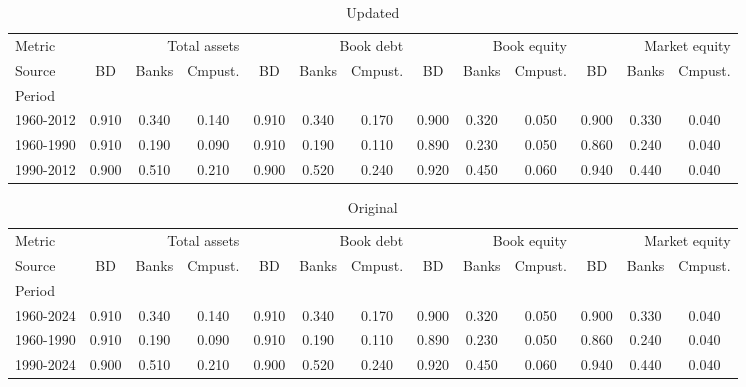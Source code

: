 \documentclass{article}
\begin{document}
    \begin{table}[htbp]
      \centering
      \caption{Updated}
      \label{tab:Table 2}
      \small
      \begin{tabular}{lcccccccccccc}
\toprule
Metric & \multicolumn{3}{r}{Total assets} & \multicolumn{3}{r}{Book debt} & \multicolumn{3}{r}{Book equity} & \multicolumn{3}{r}{Market equity} \\
Source & BD & Banks & Cmpust. & BD & Banks & Cmpust. & BD & Banks & Cmpust. & BD & Banks & Cmpust. \\
Period &  &  &  &  &  &  &  &  &  &  &  &  \\
\midrule
1960-2012 & 0.910 & 0.340 & 0.140 & 0.910 & 0.340 & 0.170 & 0.900 & 0.320 & 0.050 & 0.900 & 0.330 & 0.040 \\
1960-1990 & 0.910 & 0.190 & 0.090 & 0.910 & 0.190 & 0.110 & 0.890 & 0.230 & 0.050 & 0.860 & 0.240 & 0.040 \\
1990-2012 & 0.900 & 0.510 & 0.210 & 0.900 & 0.520 & 0.240 & 0.920 & 0.450 & 0.060 & 0.940 & 0.440 & 0.040 \\
\bottomrule
\end{tabular}

    \end{table}
    

    \begin{table}[htbp]
      \centering
      \caption{Original}
      \label{tab:Table 2}
      \small
      \begin{tabular}{lcccccccccccc}
\toprule
Metric & \multicolumn{3}{r}{Total assets} & \multicolumn{3}{r}{Book debt} & \multicolumn{3}{r}{Book equity} & \multicolumn{3}{r}{Market equity} \\
Source & BD & Banks & Cmpust. & BD & Banks & Cmpust. & BD & Banks & Cmpust. & BD & Banks & Cmpust. \\
Period &  &  &  &  &  &  &  &  &  &  &  &  \\
\midrule
1960-2024 & 0.910 & 0.340 & 0.140 & 0.910 & 0.340 & 0.170 & 0.900 & 0.320 & 0.050 & 0.900 & 0.330 & 0.040 \\
1960-1990 & 0.910 & 0.190 & 0.090 & 0.910 & 0.190 & 0.110 & 0.890 & 0.230 & 0.050 & 0.860 & 0.240 & 0.040 \\
1990-2024 & 0.900 & 0.510 & 0.210 & 0.900 & 0.520 & 0.240 & 0.920 & 0.450 & 0.060 & 0.940 & 0.440 & 0.040 \\
\bottomrule
\end{tabular}

    \end{table}
    
\end{document}

